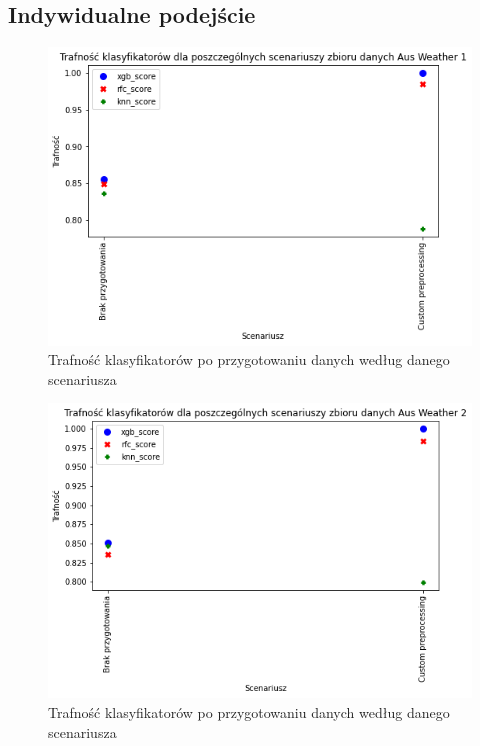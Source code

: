 \documentclass{book}
\begin{document}
\subsection{Indywidualne podejście}

\begin{figure}[H]
\centerline{\includegraphics{Aus_Weather_1_Custom}}
\centering
\caption{Trafność klasyfikatorów po przygotowaniu danych 
według danego scenariusza}
\end{figure}

\begin{figure}[H]
\centerline{\includegraphics{Aus_Weather_2_Custom}}
\centering
\caption{Trafność klasyfikatorów po przygotowaniu danych 
według danego scenariusza}
\end{figure}
\end{document}
